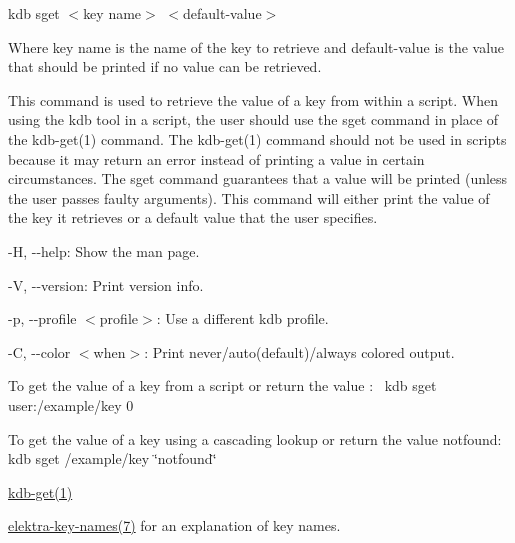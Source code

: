 {\ttfamily kdb sget $<$key name$>$ $<$default-\/value$>$}

Where {\ttfamily key name} is the name of the key to retrieve and {\ttfamily default-\/value} is the value that should be printed if no value can be retrieved.

This command is used to retrieve the value of a key from within a script. When using the kdb tool in a script, the user should use the {\ttfamily sget} command in place of the kdb-\/get(1) command. The kdb-\/get(1) command should not be used in scripts because it may return an error instead of printing a value in certain circumstances. The {\ttfamily sget} command guarantees that a value will be printed (unless the user passes faulty arguments). This command will either print the value of the key it retrieves or a default value that the user specifies.


\begin{DoxyItemize}
\item {\ttfamily -\/H}, {\ttfamily -\/-\/help}\+: Show the man page.
\item {\ttfamily -\/V}, {\ttfamily -\/-\/version}\+: Print version info.
\item {\ttfamily -\/p}, {\ttfamily -\/-\/profile $<$profile$>$}\+: Use a different kdb profile.
\item {\ttfamily -\/C}, {\ttfamily -\/-\/color $<$when$>$}\+: Print never/auto(default)/always colored output.
\end{DoxyItemize}

To get the value of a key from a script or return the value {}\+:~\newline
 {\ttfamily kdb sget user\+:/example/key 0}

To get the value of a key using a cascading lookup or return the value {\ttfamily notfound}\+:~\newline
 {\ttfamily kdb sget /example/key \char`\"{}notfound\char`\"{}}


\begin{DoxyItemize}
\item \hyperlink{doc_help_kdb-get_md}{kdb-\/get(1)}
\item \hyperlink{doc_help_elektra-key-names_md}{elektra-\/key-\/names(7)} for an explanation of key names. 
\end{DoxyItemize}